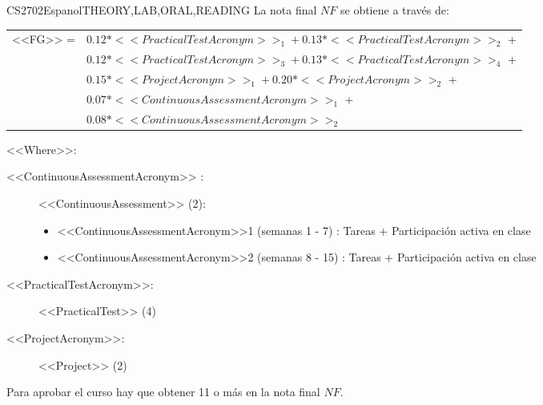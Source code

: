     \begin{evaluation}{CS2702}{Espanol}{THEORY,LAB,ORAL,READING}
    La nota final $NF$ se obtiene a través de:

    \begin{tabular}{cl}
      <<FG>> = & $0.12*<<PracticalTestAcronym>>_{1} + 0.13*<<PracticalTestAcronym>>_{2}$ + \\
               & $0.12*<<PracticalTestAcronym>>_{3} + 0.13*<<PracticalTestAcronym>>_{4}$ + \\ 
               & $0.15*<<ProjectAcronym>>_{1} + 0.20*<<ProjectAcronym>>_{2}$ + \\
               & $0.07*<<ContinuousAssessmentAcronym>>_{1}$ +\\
               & $0.08*<<ContinuousAssessmentAcronym>>_{2}$
    \end{tabular}
    
    \noindent <<Where>>:
    \begin{description}
    \item[<<ContinuousAssessmentAcronym>> :] <<ContinuousAssessment>> (2):
    \begin{itemize}
               \item  <<ContinuousAssessmentAcronym>>1 (semanas 1 - 7) : Tareas + Participación activa en clase 
                \item <<ContinuousAssessmentAcronym>>2 (semanas 8 - 15) : Tareas + Participación activa en clase 
         \end{itemize}
        \item[<<PracticalTestAcronym>>:] <<PracticalTest>> (4)
        \item[<<ProjectAcronym>>:] <<Project>> (2)     
    \end{description}
    \noindent Para aprobar el curso hay que obtener 11 o más en la nota final $NF$.
    \end{evaluation}
    
    
    
